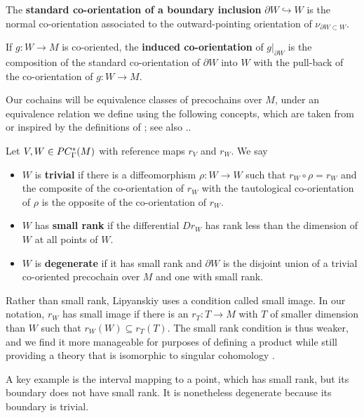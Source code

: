 \begin{definition}\label{D:boundary co-orientation}
	The {\bf standard co-orientation of a boundary inclusion} $\partial W \hookrightarrow W$ is the normal co-orientation associated to the outward-pointing orientation of $\nu_{\partial W \subset W}$.

	If $g \colon W \to M$ is co-oriented, the {\bf induced co-orientation} of $g|_{\partial W}$ is the composition of the standard co-orientation of $\partial W$ into $W$ with the pull-back of the co-orientation of $g \colon W \to M$.
\end{definition}

Our cochains will be equivalence classes of precochains over $M$, under an equivalence relation we define using the following concepts, which are taken from or inspired by the definitions of \cite{Lipy14}; see also \cite[Section 4.1]{medina2022foundations}..

\begin{definition}\label{D:cman types}
	Let $V, W\in PC_\Gamma^*(M)$ with reference maps $r_V$ and $r_W$.
	We say
	\begin{itemize}
		\item $W$ is \textbf{trivial} if there is a diffeomorphism $\rho \colon W \to W$ such that $r_W \circ \rho = r_W$
		and the composite of the co-orientation of $r_W$ with the tautological co-orientation of $\rho$ is the opposite of the co-orientation of $r_W$.
		\item $W$ has \textbf{small rank} if the differential $D r_W$ has rank less than the dimension of $W$ at all points of $W$.
		\item $W$ is \textbf{degenerate} if it has small rank and ${\partial W}$ is the disjoint union of a trivial co-oriented precochain over $M$ and one with small rank.
	\end{itemize}
\end{definition}

Rather than small rank, Lipyanskiy uses a condition called small image.
In our notation, $r_W$ has small image if there is an $r_T \colon T \to M$ with $T$ of smaller dimension than $W$ such that $r_W(W) \subseteq r_T(T)$.
The small rank condition is thus weaker, and we find it more manageable for purposes of defining a product while still providing a theory that is isomorphic to singular cohomology \cite[Theorem 5.34]{medina2022foundations}.

A key example is the interval mapping to a point, which has small rank, but its boundary does not have small rank.
It is nonetheless degenerate because its boundary is trivial.

